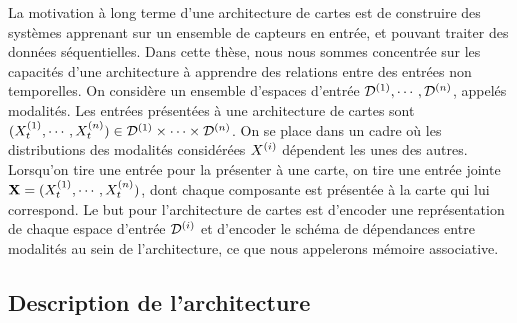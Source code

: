 \documentclass[../main]{subfiles}
\begin{document}
La motivation à long terme d'une architecture de cartes est de construire des systèmes apprenant sur un ensemble de capteurs en entrée, et pouvant traiter des données séquentielles.
Dans cette thèse, nous nous sommes concentrée sur les capacités d'une architecture à apprendre des relations entre des entrées non temporelles. 
On considère un ensemble d'espaces d'entrée $\mathcal{D}^{({1})}, \cdots , \mathcal{D}^{({n})}$, appelés modalités.
Les entrées présentées à une architecture de cartes sont $(X^{({1})}_t, \cdots, X^{({n})}_t) \in \mathcal{D}^{({1})} \times \cdots \times \mathcal{D}^{({n})}$. On se place dans un cadre où les distributions des modalités considérées $X^{({i})}$ dépendent les unes des autres. 
Lorsqu'on tire une entrée pour la présenter à une carte, on tire une entrée jointe $\mathbf{X} =  (X^{({1})}_t, \cdots , X^{({n})}_t)$, dont chaque composante est présentée à la carte qui lui correspond. 
Le but pour l'architecture de cartes est d'encoder une représentation de chaque espace d'entrée $\mathcal{D}^{({i})}$ et d'encoder le schéma de dépendances entre modalités au sein de l'architecture, ce que nous appelerons mémoire associative.


\subsection{Description de l'architecture}
\end{document}
